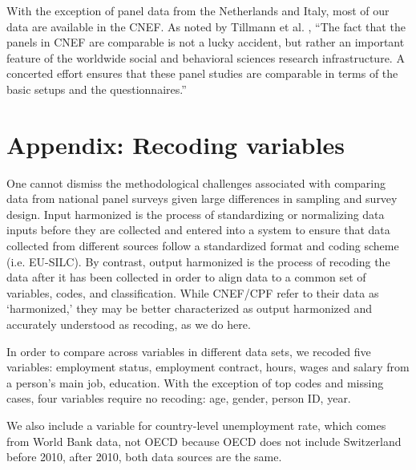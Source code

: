 With the exception of panel data from the Netherlands and Italy, most of our data are available in the CNEF.  As noted by Tillmann et al. \citeyearpar[pg. vii]{tillmann2018social}, ``The fact that the panels in CNEF are comparable is not a lucky accident, but rather an important feature of the worldwide social and behavioral sciences research infrastructure. A concerted effort ensures that these panel studies are comparable in terms of the basic setups and the questionnaires.''  


\clearpage
\setcounter{table}{0}
\setcounter{figure}{0}
\renewcommand*\thetable{\Alph{section}.\arabic{table}}
\renewcommand*\thefigure{\Alph{section}.\arabic{figure}}
\renewcommand{\theHfigure}{\Alph{section}.\arabic{table}}
\renewcommand{\theHtable}{\Alph{section}.\arabic{figure}}

\section{Appendix: Recoding variables}\label{sec:variables}

One cannot dismiss the methodological challenges associated with comparing data from national panel surveys given large differences in sampling and survey design. Input harmonized is the process of standardizing or normalizing data inputs before they are collected and entered into a system to ensure that data collected from different sources follow a standardized format and coding scheme (i.e. EU-SILC).  By contrast, output harmonized is the process of recoding the data after it has been collected in order to align data to a common set of variables, codes, and classification.  While CNEF/CPF refer to their data as `harmonized,' they may be better characterized as output harmonized and accurately understood as recoding, as we do here.  

In order to compare across variables in different data sets, we recoded five variables: employment status, employment contract, hours, wages and salary from a person's main job, education.  With the exception of top codes and missing cases, four variables require no recoding: age, gender, person ID, year.  

We also include a variable for country-level unemployment rate, which comes from World Bank data, not OECD because OECD does not include Switzerland before 2010, after 2010, both data sources are the same. 

